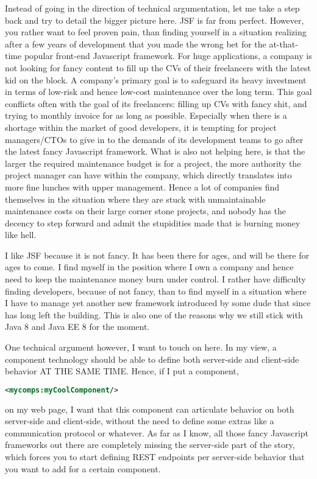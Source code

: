 Instead of going in the direction of technical argumentation, let me take a step back and try to detail the bigger picture here.
JSF is far from perfect.
However, you rather want to feel proven pain, than finding yourself in a situation realizing after a few years of development that you made the wrong bet for the at-that-time popular front-end Javascript framework.
For huge applications, a company is not looking for fancy content to fill up the CVs of their freelancers with the latest kid on the block.
A company's primary goal is to safeguard its heavy investment in terms of low-risk and hence low-cost maintenance over the long term.
This goal conflicts often with the goal of its freelancers: filling up CVs with fancy shit, and trying to monthly invoice for as long as possible.
Especially when there is a shortage within the market of good developers,
it is tempting for project managers/CTOs to give in to the demands of its development teams to go after the latest fancy Javascript framework.
What is also not helping here, is that the larger the required maintenance budget is for a project,
the more authority the project manager can have within the company,
which directly translates into more fine lunches with upper management.
Hence a lot of companies find themselves in the situation where they are stuck with unmaintainable maintenance costs on their large corner stone projects, and nobody has the decency to step forward and admit the stupidities made that is burning money like hell.

I like JSF because it is not fancy.
It has been there for ages, and will be there for ages to come.
I find myself in the position where I own a company and hence need to keep the maintenance money burn under control.
I rather have difficulty finding developers, because of not fancy, than to find myself in a situation where I have to manage yet another new framework introduced by some dude that since has long left the building.
This is also one of the reasons why we still stick with Java 8 \cite{GoslingJoyEtAl14} and Java EE 8 \cite{JavaEE8} for the moment.

One technical argument however, I want to touch on here.
In my view, a component technology should be able to define both server-side and client-side behavior AT THE SAME TIME.
Hence, if I put a component,
\begin{lstlisting}[language=XML]
	<mycomps:myCoolComponent/>
\end{lstlisting}
on my web page, I want that this component can articulate behavior on both server-side and client-side, without the need to define some extras like a communication protocol or whatever.
As far as I know, all those fancy Javascript frameworks out there are completely missing the server-side part of the story, which forces you to start defining REST endpoints per server-side behavior that you want to add for a certain component.

